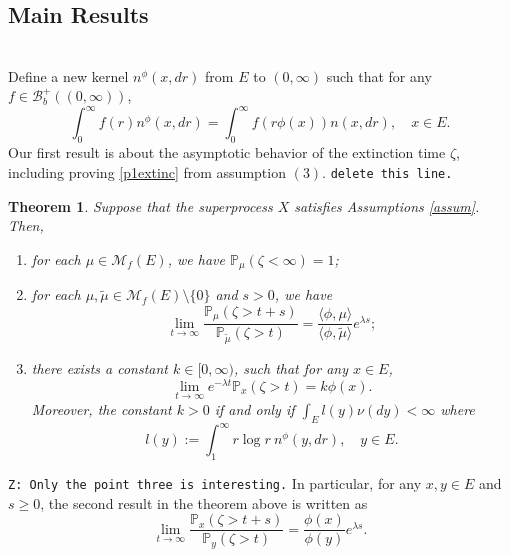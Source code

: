 \documentclass[12pt,a4paper]{amsart}
\numberwithin{equation}{section}
\theoremstyle{plain}
\newtheorem{thm}{Theorem}[section]
\theoremstyle{definition}
\theoremstyle{remark}
\begin{document}
\subsection{Main Results}
\hspace*{10pt}\\
Define a new kernel $n^\phi(x, dr)$ from $E$ to $(0,\infty)$ such that for any $f\in\mathcal B_b^+((0,\infty))$,
\begin{equation} \label{phi-change}
	\int_0^\infty f(r)n^\phi(x,dr)=\int_0^\infty f(r\phi(x))n(x, dr),
	\quad x\in E.
\end{equation}
	Our first result is about the asymptotic behavior of the extinction time $\zeta$, including proving \eqref{p1extinc} from assumption $(3)$. 
	{\tt delete this line.}

\begin{thm}\label{thm: distribution of zeta}
	Suppose that the superprocess $X$ satisfies Assumptions \ref{assum}. Then,
\begin{enumerate}
\item \label{subthm: extinct as sure}
	for each $\mu \in \mathcal M_f(E)$, we have  $\mathbb P_\mu(\zeta<\infty)=1$;
\item
 	for each $\mu,\tilde\mu\in \mathcal M_f(E)\setminus\{0\}$ and $s>0$, we have
 \[
 	\lim_{t\rightarrow\infty}\dfrac{\mathbb P_{\mu}(\zeta>t+s)}{\mathbb P_{\tilde\mu}(\zeta>t)}=\frac{\langle \phi,\mu\rangle }{\langle \phi,\tilde\mu\rangle }e^{\lambda s};
 \]
 \item
 	there exists a constant $k\in [0,\infty)$, such that for any $x\in E$,
\begin{equation}\label{decay rate}
	\lim_{t\rightarrow\infty} e^{-\lambda t}\mathbb P_x(\zeta>t)=k\phi(x).
\end{equation}
	Moreover, the constant $k>0$ if and only if $\int_E l(y)\nu(dy)<\infty$ where
\begin{equation}\label{def: m}
	l(y):=\int_1^\infty r\log r~n^\phi(y, dr),\quad y \in E.
\end{equation}
\end{enumerate}
\end{thm}

	{\tt Z: Only the point three is interesting.}
In particular, for any $x,y\in E$ and $s\geq 0$, the second result in the theorem above is written as
\begin{equation}\label{ratioresult}
 	\lim_{t\rightarrow\infty}\frac{\mathbb P_x(\zeta>t+s)}{\mathbb P_y(\zeta>t)}=\frac{\phi(x)}{\phi(y)}e^{\lambda s}.
\end{equation}
\end{document}
